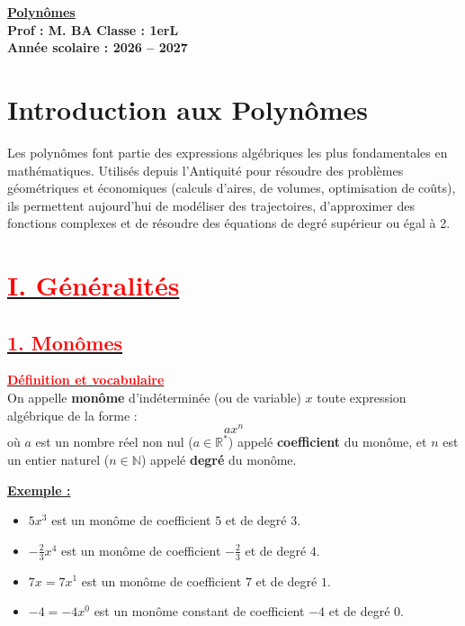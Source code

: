 \documentclass[12pt,a4paper]{article}
\newcounter{exemple}
\newcommand{\exemple}{%
  \refstepcounter{exemple}%
  \textbf{\textcolor{green!60!black}{Exemple \theexemple :}} \ignorespaces
}
\begin{document}
\begin{center}
    \Large\textbf{\underline{Polynômes}}\\[-0.1cm]
    \normalsize\textbf{Prof : M. BA} \hfill \textbf{Classe : 1erL}\\[-0.1cm]
    \textbf{Année scolaire : 2026 -- 2027}
\end{center}

\section*{Introduction aux Polynômes}
Les polynômes font partie des expressions algébriques les plus fondamentales en mathématiques. Utilisés depuis l'Antiquité pour résoudre des problèmes géométriques et économiques (calculs d'aires, de volumes, optimisation de coûts), ils permettent aujourd'hui de modéliser des trajectoires, d'approximer des fonctions complexes et de résoudre des équations de degré supérieur ou égal à 2.

\section*{\underline{\textbf{\textcolor{red}{I. Généralités }}}}

\subsection*{\underline{\textbf{\textcolor{red}{1. Monômes}}}} 
\underline{\textbf{\textcolor{red}{Définition et vocabulaire}}} \\
On appelle \textbf{monôme} d'indéterminée (ou de variable) $x$ toute expression algébrique de la forme :
$$ax^{n}$$
où $a$ est un nombre réel non nul ($a \in \mathbb{R}^*$) appelé \textbf{coefficient} du monôme, et $n$ est un entier naturel ($n \in \mathbb{N}$) appelé \textbf{degré} du monôme.

\medskip
\underline{\exemple}
\begin{itemize}[label=]
    \item $5x^3$ est un monôme de coefficient $5$ et de degré $3$.
    \item $-\frac{2}{3}x^4$ est un monôme de coefficient $-\frac{2}{3}$ et de degré $4$.
    \item $7x = 7x^1$ est un monôme de coefficient $7$ et de degré $1$.
    \item $-4 = -4x^0$ est un monôme constant de coefficient $-4$ et de degré $0$.
\end{itemize}
\end{document}
